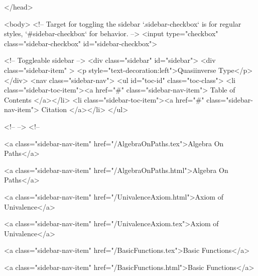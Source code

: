   
</head>




  <body>
    <!-- Target for toggling the sidebar `.sidebar-checkbox` is for regular
     styles, `#sidebar-checkbox` for behavior. -->
<input type="checkbox" class="sidebar-checkbox" id="sidebar-checkbox">

<!-- Toggleable sidebar -->
<div class="sidebar" id="sidebar">
  <div class="sidebar-item" >
    <p style="text-decoration:left">Quasiinverse Type</p>
  </div>
  <nav class="sidebar-nav">
    <ul id="toc-id" class="toc-class">
  <li class="sidebar-toc-item"><a href="#" class="sidebar-nav-item"> Table of Contents </a></li>
  <li class="sidebar-toc-item"><a href="#" class="sidebar-nav-item"> Citation </a></li>
</ul>


    <!--  -->
    <!-- 
      
    
      
    
      
    
      
        
      
    
      
        
          <a class="sidebar-nav-item" href="/AlgebraOnPaths.tex">Algebra On Paths</a>
        
      
    
      
        
          <a class="sidebar-nav-item" href="/AlgebraOnPaths.html">Algebra On Paths</a>
        
      
    
      
        
          <a class="sidebar-nav-item" href="/UnivalenceAxiom.html">Axiom of Univalence</a>
        
      
    
      
        
          <a class="sidebar-nav-item" href="/UnivalenceAxiom.tex">Axiom of Univalence</a>
        
      
    
      
        
          <a class="sidebar-nav-item" href="/BasicFunctions.tex">Basic Functions</a>
        
      
    
      
        
          <a class="sidebar-nav-item" href="/BasicFunctions.html">Basic Functions</a>
        
      
    
      
        
